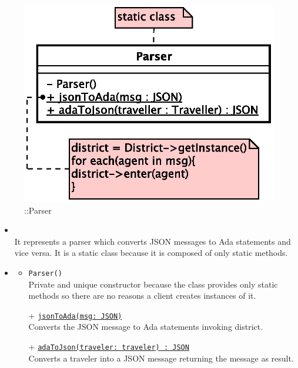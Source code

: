 \begin{figure}[h]
\centering
\includegraphics[scale=0.6,keepaspectratio]{images/solution/app/backend/parser.eps}
\caption{\pInterface::Parser}
\label{fig:sd-app-parser}
\end{figure}
\FloatBarrier
\begin{itemize}
  \item \textbf{\descr} \\
    It represents a parser which converts JSON messages to Ada statements and vice versa.
    It is a static class because it is composed of only static methods.
  \item \textbf{\ops}
  \begin{itemize}
   \item \texttt{Parser()} \\
   Private and unique constructor because the class provides only static methods 
    so there are no reasons a client creates instances of it.
    \item[+] \texttt{\underline{jsonToAda(msg: JSON)}} \\
    Converts the JSON message to Ada statements invoking district.
    \item[+] \texttt{\underline{adaToJson(traveler: traveler) : JSON}} \\
    Converts a traveler into a JSON message returning the message as result.
  \end{itemize}
\end{itemize}
